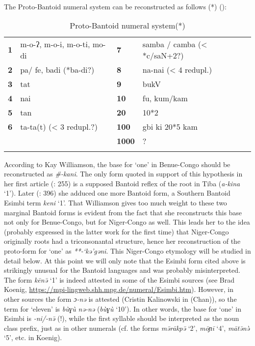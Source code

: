 The Proto-Bantoid numeral system can be reconstructed as follows (*) ():

\clearpage 
\begin{table}
\caption[Proto-Bantoid numeral system]{\label{tab:3:14}Proto-Bantoid numeral system(*)\footnotemark} 


\begin{tabularx}{\textwidth}{lXlX}
\lsptoprule

\textbf{1} & m-o-ʔ, m-o-i, m-o-ti, mo-di & \textbf{7} & samba / camba (< *c/saN+2?)\\
\textbf{2} & pa/ fe, badi (*ba-di?) & \textbf{8} & na-nai (< 4 redupl.)\\
\textbf{3} & tat & \textbf{9} & bukV\\
\textbf{4} & nai & \textbf{10} & fu, kum/kam\\
\textbf{5} & tan & \textbf{20} & 10*2\\
\textbf{6} & ta-ta(t) (< 3 redupl.?) & \textbf{100} & gbi\biberror{?} ki\biberror{?} 20*5\biberror{?} kam\biberror{?}\\
&  & \textbf{1000} & ?\\
\lspbottomrule
\end{tabularx}
\end{table}

According to Kay Williamson, the base for `one' in Benue-Congo should be reconstructed as \textit{\#-kani}. The only form quoted in support of this hypothesis in her first article (\citealt{Williamson1989b}: 255) is a supposed Bantoid reflex of the root in Tiba (\textit{a-kina} ‘1’). Later (\citealt{Williamson1992}: 396) she adduced one more Bantoid form, a Southern Bantoid Esimbi term \textit{keni} ‘1’. That Williamson gives too much weight to these two marginal Bantoid forms is evident from the fact that she reconstructs this base not only for Benue-Congo, but for Niger-Congo as well. This leads her to the idea (probably expressed in the latter work for the first time) that Niger-Congo originally roots had a triconsonantal structure, hence her reconstruction of the proto-form for ‘one’ as \textit{**-‘kə’gəni}. This Niger-Congo etymology will be studied in detail below. At this point we will only note that the Esimbi form cited above is strikingly unusual for the Bantoid languages and was probably misinterpreted. The form \textit{k{\={e}}n{\={ə}}} ‘1’ is indeed attested in some of the Esimbi sources (see Brad Koenig, \url{https://mpi-lingweb.shh.mpg.de/numeral/Esimbi.htm}). However, in other sources the form \textit{ɔ-nə} is attested (Cristin Kalinowski in (Chan)), so the term for ‘eleven’ is \textit{bùɣù} \textit{nə-nə} (\textit{bùɣù} ‘10’). In other words, the base for ‘one’ in Esimbi is \textit{-ni/-n{\={ə}}} (!), while the first syllable should be interpreted as the noun class prefix, just as in other numerals (cf. the forms \textit{m{\={ə}}r{\={a}}kp{\={ə}}} ‘2’, \textit{m{\={o}}ɲ{\={i}}} ‘4’, \textit{m{\={a}}t{\={ə}}n{\`{ə}}} ‘5’, etc. in Koenig). 

